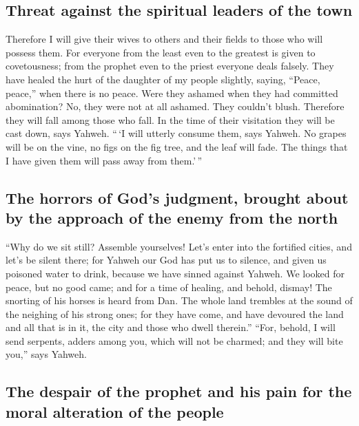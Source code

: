 \hypertarget{threat-against-the-spiritual-leaders-of-the-town}{%
\subsection{Threat against the spiritual leaders of the
town}\label{threat-against-the-spiritual-leaders-of-the-town}}

 Therefore I will give their wives to others and their
fields to those who will possess them. For everyone from the least even
to the greatest is given to covetousness; from the prophet even to the
priest everyone deals falsely.  They have healed the hurt
of the daughter of my people slightly, saying, ``Peace, peace,'' when
there is no peace.  Were they ashamed when they had
committed abomination? No, they were not at all ashamed. They couldn't
blush. Therefore they will fall among those who fall. In the time of
their visitation they will be cast down, says Yahweh. 
``\,`I will utterly consume them, says Yahweh. No grapes will be on the
vine, no figs on the fig tree, and the leaf will fade. The things that I
have given them will pass away from them.'\,''

\hypertarget{the-horrors-of-gods-judgment-brought-about-by-the-approach-of-the-enemy-from-the-north}{%
\subsection{The horrors of God's judgment, brought about by the approach
of the enemy from the
north}\label{the-horrors-of-gods-judgment-brought-about-by-the-approach-of-the-enemy-from-the-north}}

 ``Why do we sit still? Assemble yourselves! Let's enter
into the fortified cities, and let's be silent there; for Yahweh our God
has put us to silence, and given us poisoned water to drink, because we
have sinned against Yahweh.  We looked for peace, but no
good came; and for a time of healing, and behold, dismay!
 The snorting of his horses is heard from Dan. The whole
land trembles at the sound of the neighing of his strong ones; for they
have come, and have devoured the land and all that is in it, the city
and those who dwell therein.''  ``For, behold, I will
send serpents, adders among you, which will not be charmed; and they
will bite you,'' says Yahweh.

\hypertarget{the-despair-of-the-prophet-and-his-pain-for-the-moral-alteration-of-the-people}{%
\subsection{The despair of the prophet and his pain for the moral
alteration of the
people}\label{the-despair-of-the-prophet-and-his-pain-for-the-moral-alteration-of-the-people}}

